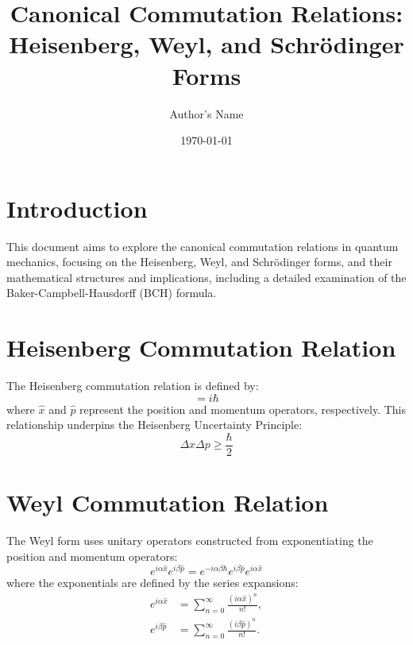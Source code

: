 \documentclass{article}
\title{Canonical Commutation Relations: Heisenberg, Weyl, and Schrödinger Forms}
\author{Author's Name}
\date{\today}
\begin{document}
\maketitle

\section{Introduction}
This document aims to explore the canonical commutation relations in quantum mechanics, focusing on the Heisenberg, Weyl, and Schrödinger forms, and their mathematical structures and implications, including a detailed examination of the Baker-Campbell-Hausdorff (BCH) formula.

\section{Heisenberg Commutation Relation}
The Heisenberg commutation relation is defined by:
\begin{equation}
    [\hat{x}, \hat{p}] = i\hbar
\end{equation}
where \(\hat{x}\) and \(\hat{p}\) represent the position and momentum operators, respectively. This relationship underpins the Heisenberg Uncertainty Principle:
\begin{equation}
    \Delta x \Delta p \geq \frac{\hbar}{2}
\end{equation}

\section{Weyl Commutation Relation}
The Weyl form uses unitary operators constructed from exponentiating the position and momentum operators:
\begin{equation}
    e^{i\alpha \hat{x}} e^{i\beta \hat{p}} = e^{-i\alpha \beta \hbar} e^{i\beta \hat{p}} e^{i\alpha \hat{x}}
\end{equation}
where the exponentials are defined by the series expansions:
\begin{align}
    e^{i\alpha \hat{x}} &= \sum_{n=0}^\infty \frac{(i\alpha \hat{x})^n}{n!}, \\
    e^{i\beta \hat{p}} &= \sum_{n=0}^\infty \frac{(i\beta \hat{p})^n}{n!}.
\end{align}
\end{document}
